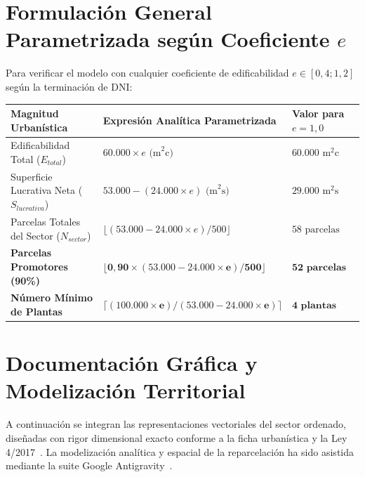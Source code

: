 \documentclass[11pt,a4paper]{article}
\begin{document}
\section{Formulación General Parametrizada según Coeficiente \texorpdfstring{$e$}{e}}

Para verificar el modelo con cualquier coeficiente de edificabilidad $e \in [0,4 ; 1,2]$ según la terminación de DNI:

\begin{center}
\small
\begin{tabularx}{\textwidth}{l X l}
  \toprule
  \textbf{Magnitud Urbanística} & \textbf{Expresión Analítica Parametrizada} & \textbf{Valor para $e = 1,0$} \\
  \midrule
  Edificabilidad Total ($E_{total}$) & $60.000 \times e\text{ (m}^2\text{c)}$ & $60.000\text{ m}^2\text{c}$ \\
  Superficie Lucrativa Neta ($S_{lucrativa}$) & $53.000 - (24.000 \times e)\text{ (m}^2\text{s)}$ & $29.000\text{ m}^2\text{s}$ \\
  Parcelas Totales del Sector ($N_{sector}$) & $\lfloor (53.000 - 24.000 \times e) / 500 \rfloor$ & $58\text{ parcelas}$ \\
  \textbf{Parcelas Promotores (90\%)} & $\mathbf{\lfloor 0,90 \times (53.000 - 24.000 \times e) / 500 \rfloor}$ & $\mathbf{52\text{ parcelas}}$ \\
  \textbf{Número Mínimo de Plantas} & $\mathbf{\lceil (100.000 \times e) / (53.000 - 24.000 \times e) \rceil}$ & $\mathbf{4\text{ plantas}}$ \\
  \bottomrule
\end{tabularx}
\end{center}

\newpage
\section{Documentación Gráfica y Modelización Territorial}

A continuación se integran las representaciones vectoriales del sector ordenado, diseñadas con rigor dimensional exacto conforme a la ficha urbanística y la Ley 4/2017~\cite{ley4_2017_canarias}. La modelización analítica y espacial de la reparcelación ha sido asistida mediante la suite Google Antigravity~\cite{antigravity2026}.
\end{document}

